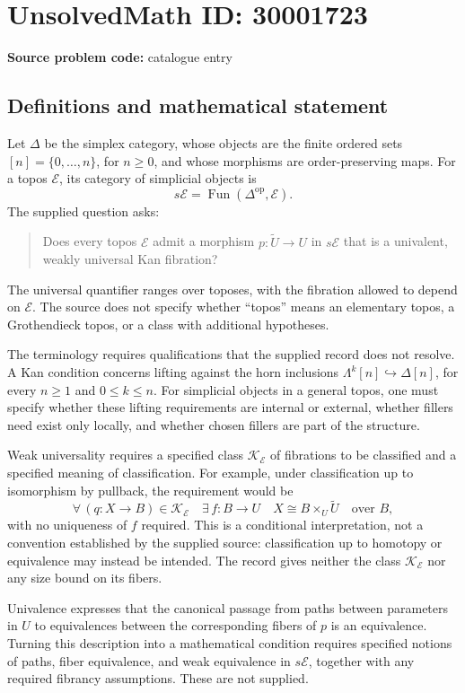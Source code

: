 \documentclass[11pt]{article}
\begin{document}
\section*{UnsolvedMath ID: 30001723}
\textbf{Source problem code:} catalogue entry
\subsection{Definitions and mathematical statement}
Let \(\Delta\) be the simplex category, whose objects are the finite ordered sets \([n]=\{0,\ldots,n\}\), for \(n\geq 0\), and whose morphisms are order-preserving maps. For a topos \(\mathcal E\), its category of simplicial objects is
\[
s\mathcal E=\operatorname{Fun}(\Delta^{\mathrm{op}},\mathcal E).
\]
The supplied question asks:
\begin{quote}
Does every topos \(\mathcal E\) admit a morphism \(p:\widetilde U\to U\) in \(s\mathcal E\) that is a univalent, weakly universal Kan fibration?
\end{quote}
The universal quantifier ranges over toposes, with the fibration allowed to depend on \(\mathcal E\). The source does not specify whether ``topos'' means an elementary topos, a Grothendieck topos, or a class with additional hypotheses.

The terminology requires qualifications that the supplied record does not resolve. A Kan condition concerns lifting against the horn inclusions \(\Lambda^k[n]\hookrightarrow\Delta[n]\), for every \(n\geq 1\) and \(0\leq k\leq n\). For simplicial objects in a general topos, one must specify whether these lifting requirements are internal or external, whether fillers need exist only locally, and whether chosen fillers are part of the structure.

Weak universality requires a specified class \(\mathscr K_{\mathcal E}\) of fibrations to be classified and a specified meaning of classification. For example, under classification up to isomorphism by pullback, the requirement would be
\[
\forall\,(q:X\to B)\in\mathscr K_{\mathcal E}\quad
\exists\,f:B\to U\quad
X\cong B\times_U\widetilde U\quad\text{over }B,
\]
with no uniqueness of \(f\) required. This is a conditional interpretation, not a convention established by the supplied source: classification up to homotopy or equivalence may instead be intended. The record gives neither the class \(\mathscr K_{\mathcal E}\) nor any size bound on its fibers.

Univalence expresses that the canonical passage from paths between parameters in \(U\) to equivalences between the corresponding fibers of \(p\) is an equivalence. Turning this description into a mathematical condition requires specified notions of paths, fiber equivalence, and weak equivalence in \(s\mathcal E\), together with any required fibrancy assumptions. These are not supplied.
\end{document}
